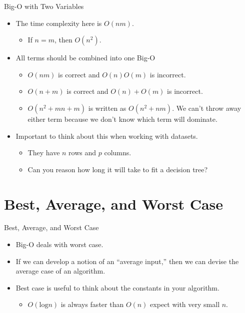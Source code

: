 \documentclass[
  ignorenonframetext,
]{beamer}
\providecommand{\tightlist}{%
  \setlength{\itemsep}{0pt}\setlength{\parskip}{0pt}}\usepackage{longtable,booktabs,array}
\begin{document}
\begin{frame}{Big-O with Two Variables}
\protect\hypertarget{big-o-with-two-variables-1}{}
\begin{itemize}
\item
  The time complexity here is \(O(nm)\).

  \begin{itemize}
  \tightlist
  \item
    If \(n = m\), then \(O(n^2)\).
  \end{itemize}
\item
  All terms should be combined into one Big-O

  \begin{itemize}
  \item
    \(O(nm)\) is correct and \(O(n)O(m)\) is incorrect.
  \item
    \(O(n + m)\) is correct and \(O(n) + O(m)\) is incorrect.
  \item
    \(O(n^2 + mn + m)\) is written as \(O(n^2 + nm)\). We can't throw
    away either term because we don't know which term will dominate.
  \end{itemize}
\item
  Important to think about this when working with datasets.

  \begin{itemize}
  \item
    They have \(n\) rows and \(p\) columns.
  \item
    Can you reason how long it will take to fit a decision tree?
  \end{itemize}
\end{itemize}
\end{frame}

\hypertarget{best-average-and-worst-case}{%
\section{Best, Average, and Worst
Case}\label{best-average-and-worst-case}}

\begin{frame}{Best, Average, and Worst Case}
\protect\hypertarget{best-average-and-worst-case-1}{}
\begin{itemize}
\item
  Big-O deals with worst case.
\item
  If we can develop a notion of an ``average input,'' then we can devise
  the average case of an algorithm.
\item
  Best case is useful to think about the constants in your algorithm.

  \begin{itemize}
  \tightlist
  \item
    \(O(\text{log}n)\) is always faster than \(O(n)\) expect with very
    small \(n\).
  \end{itemize}
\end{itemize}
\end{frame}
\end{document}
